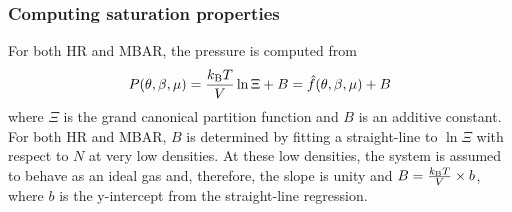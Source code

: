 \documentclass[journal=jced,manuscript=article]{achemso}
\begin{document}
%

\subsubsection{Computing saturation properties} \label{sec: Saturation}

For both HR and MBAR, the pressure is computed from
\begin{equation} \label{eq: press}
P(\theta,\beta,\mu) = \frac{k_{\rm B} T}{V} \ln \Xi + B = \hat f(\theta,\beta,\mu) + B
\end{equation}
where $\Xi$ is the grand canonical partition function and $B$ is an additive constant. For both HR and MBAR, $B$ is determined by fitting a straight-line to $\ln \Xi$ with respect to $N$ at very low densities. At these low densities, the system is assumed to behave as an ideal gas and, therefore, the slope is unity and $B = \frac{k_{\rm B} T}{V} \times b$, where $b$ is the y-intercept from the straight-line regression.
\end{document}
